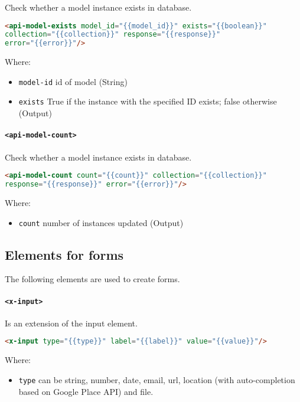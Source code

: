 Check whether a model instance exists in database.

\begin{lstlisting}[language=html]
<api-model-exists model_id="{{model_id}}" exists="{{boolean}}" 
collection="{{collection}}" response="{{response}}" 
error="{{error}}"/>
\end{lstlisting}
Where:
\begin{itemize}
\item \texttt{model-id} id of model (String)
\item \texttt{exists} True if the instance with the specified ID exists; false otherwise (Output)
\end{itemize}

\paragraph{\texttt{<api-model-count>}}

Check whether a model instance exists in database.

\begin{lstlisting}[language=html]
<api-model-count count="{{count}}" collection="{{collection}}" 
response="{{response}}" error="{{error}}"/>
\end{lstlisting}
Where:
\begin{itemize}
\item \texttt{count} number of instances updated (Output)
\end{itemize}

\subsection{Elements for forms}

The following elements are used to create forms.

\paragraph{\texttt{<x-input>}} 

Is an extension of the input element.
\begin{lstlisting}[language=html]
<x-input type="{{type}}" label="{{label}}" value="{{value}}"/>
\end{lstlisting}
Where:
\begin{itemize}
\item \texttt{type} can be string, number, date, email, url, location (with auto-completion based on Google Place API) and file.
\end{itemize}

